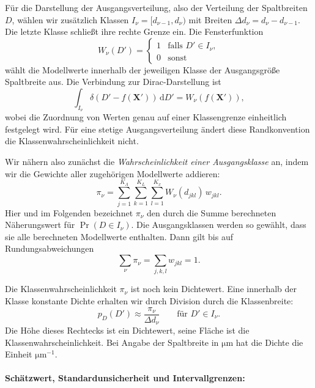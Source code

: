 Für die Darstellung der Ausgangsverteilung, also der Verteilung der Spaltbreiten $D$, wählen wir zusätzlich
Klassen $I_\nu=[d_{\nu-1},d_\nu)$ mit Breiten
$\Delta d_\nu=d_\nu-d_{\nu-1}$.
Die letzte Klasse schließt ihre rechte Grenze ein.
Die Fensterfunktion
\begin{equation}
W_\nu(D')=
\begin{cases}
1 & \text{falls }D'\in I_\nu,\\
0 & \text{sonst}
\end{cases}
\end{equation}
wählt die Modellwerte innerhalb der jeweiligen Klasse der Ausgangsgröße Spaltbreite aus.
Die Verbindung zur Dirac-Darstellung ist
\begin{equation}
\int_{I_\nu}\delta(D'-f(\mathbf X'))\,\mathrm dD'
=W_\nu(f(\mathbf X')),
\end{equation}
wobei die Zuordnung von Werten genau auf einer Klassengrenze
einheitlich festgelegt wird. Für eine stetige Ausgangsverteilung
ändert diese Randkonvention die Klassenwahrscheinlichkeit nicht.

Wir nähern also zunächst die \emph{Wahrscheinlichkeit einer
Ausgangsklasse} an, indem wir die Gewichte aller zugehörigen
Modellwerte addieren:
\begin{equation}
\boxed{
\pi_\nu
=
\sum_{j=1}^{K_\Lambda}
\sum_{k=1}^{K_L}
\sum_{l=1}^{K_x}
W_\nu(d_{jkl})\,w_{jkl}.
}
\label{eq:probCombinationSpaltdiscrete}
\end{equation}
Hier und im Folgenden bezeichnet $\pi_\nu$ den durch die Summe
berechneten Näherungswert für $\Pr(D\in I_\nu)$.
Die Ausgangsklassen werden so gewählt,
dass sie alle berechneten Modellwerte enthalten.
Dann gilt bis auf Rundungsabweichungen
\begin{equation}
\sum_\nu\pi_\nu=\sum_{j,k,l}w_{jkl}=1.
\end{equation}

Die Klassenwahrscheinlichkeit $\pi_\nu$ ist noch kein Dichtewert.
Eine innerhalb der Klasse konstante Dichte erhalten wir durch
Division durch die Klassenbreite:
\begin{equation}
p_D(D')\approx\frac{\pi_\nu}{\Delta d_\nu}
\qquad\text{für }D'\in I_\nu.
\end{equation}
Die Höhe dieses Rechtecks ist ein Dichtewert, seine Fläche ist
die Klassenwahrscheinlichkeit.
Bei Angabe der Spaltbreite in $\mathrm{\mu m}$ hat die Dichte
die Einheit $\mathrm{\mu m}^{-1}$.

\paragraph{Schätzwert, Standardunsicherheit und Intervallgrenzen:}

